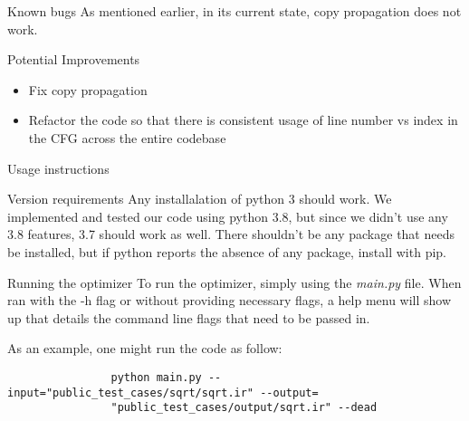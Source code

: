 \documentclass[letterpaper,12pt]{article}
\theoremstyle{definition}
\begin{document}
	\begin{section}{Known bugs}
		As mentioned earlier, in its current state, copy propagation does not work.
	\end{section}

	\begin{section}{Potential Improvements}
		\begin{itemize}
			\item Fix copy propagation
			\item Refactor the code so that there is consistent usage of line number vs index in the CFG across the entire codebase
		\end{itemize}
	\end{section}

	\begin{section}{Usage instructions}
		\begin{subsection}{Version requirements}
			Any installalation of python 3 should work. We implemented and tested our code using python 3.8, but since we didn't use any 3.8 features, 3.7 should work as well. There shouldn't be any package that needs be installed, but if python reports the absence of any package, install with pip.
		\end{subsection}

		\begin{subsection}{Running the optimizer}
			To run the optimizer, simply using the \textit{main.py} file. When ran with the -h flag or without providing necessary flags, a help menu will show up that details the command line flags that need to be passed in.

			As an example, one might run the code as follow: \\
			\begin{verbatim}
				python main.py --input="public_test_cases/sqrt/sqrt.ir" --output=
				"public_test_cases/output/sqrt.ir" --dead
			\end{verbatim}
		\end{subsection}
	\end{section}
\end{document}
